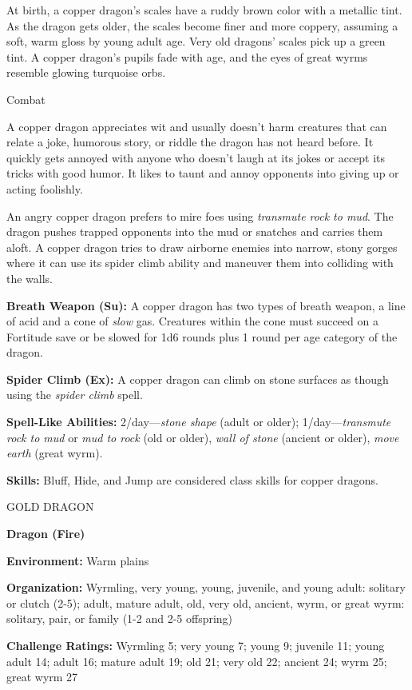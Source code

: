 \documentclass{article}
\begin{document}
{At birth, a copper dragon's scales have a ruddy brown color with a metallic tint. 
As the dragon gets older, the scales become finer and more coppery, assuming a 
soft, warm gloss by young adult age. Very old dragons' scales pick up a green tint. 
A copper dragon's pupils fade with age, and the eyes of great wyrms resemble glowing 
turquoise orbs.

Combat

A copper dragon appreciates wit and usually doesn't harm creatures that can relate 
a joke, humorous story, or riddle the dragon has not heard before. It quickly gets 
annoyed with anyone who doesn't laugh at its jokes or accept its tricks with good 
humor. It likes to taunt and annoy opponents into giving up or acting foolishly.

An angry copper dragon prefers to mire foes using \textit{transmute rock to mud}. 
The dragon pushes trapped opponents into the mud or snatches and carries them aloft. 
A copper dragon tries to draw airborne enemies into narrow, stony gorges where 
it can use its spider climb ability and maneuver them into colliding with the walls.

\textbf{Breath Weapon (Su):} A copper dragon has two types of breath weapon, a 
line of acid and a cone of \textit{slow }gas. Creatures within the cone must succeed 
on a Fortitude save or be slowed for 1d6 rounds plus 1 round per age category of 
the dragon.

\textbf{Spider Climb (Ex):} A copper dragon can climb on stone surfaces as though 
using the \textit{spider climb }spell.

\textbf{Spell-Like Abilities:} 2/day---\textit{stone shape }(adult or older); 1/day---\textit{transmute 
rock to mud }or \textit{mud to rock }(old or older), \textit{wall of stone }(ancient 
or older), \textit{move earth }(great wyrm).

\textbf{Skills:} Bluff, Hide, and Jump are considered class skills for copper dragons.

\vspace{12pt}
GOLD DRAGON

\textbf{Dragon (Fire)}

\textbf{Environment: }Warm plains

\textbf{Organization:} Wyrmling, very young, young, juvenile, and young adult: 
solitary or clutch (2-5); adult, mature adult, old, very old, ancient, wyrm, or 
great wyrm: solitary, pair, or family (1-2 and 2-5 offspring)

\textbf{Challenge Ratings:} Wyrmling 5; very young 7; young 9; juvenile 11; young 
adult 14; adult 16; mature adult 19; old 21; very old 22; ancient 24; wyrm 25; 
great wyrm 27

}
\end{document}
